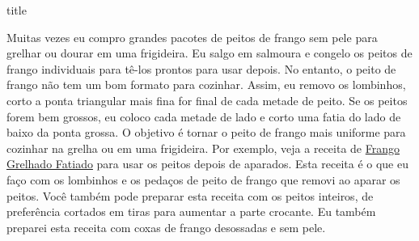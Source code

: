 \documentclass [11pt, papel de carta] {article}
\begin{document}
 {title}

Muitas vezes eu compro grandes pacotes de peitos de frango sem pele para grelhar ou dourar em uma frigideira. Eu salgo em salmoura e congelo os peitos de frango individuais para tê-los prontos para usar depois. No entanto, o peito de frango não tem um bom formato para cozinhar. Assim, eu removo os lombinhos, corto a ponta triangular mais fina for final de cada metade de peito. Se os peitos forem bem grossos, eu coloco cada metade de lado e corto uma fatia do lado de baixo da ponta grossa. O objetivo é tornar o peito de frango mais uniforme para cozinhar na grelha ou em uma frigideira. Por exemplo, veja a receita de \href {SlicedGrilledChicken.html} {Frango Grelhado Fatiado} para usar os peitos depois de aparados. Esta receita é o que eu faço com os lombinhos e os pedaços de peito de frango que removi ao aparar os peitos. Você também pode preparar esta receita com os peitos inteiros, de preferência cortados em tiras para aumentar a parte crocante. Eu também preparei esta receita com coxas de frango desossadas e sem pele.
\end{document}
